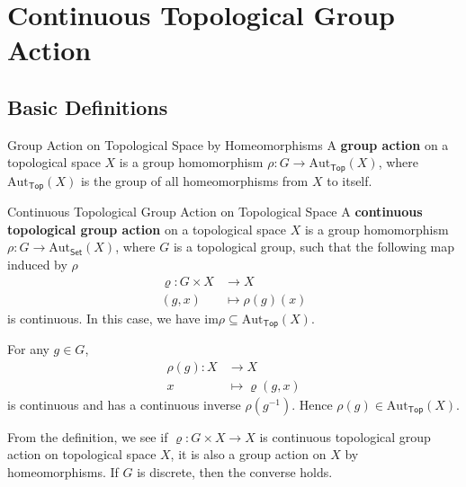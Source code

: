 \documentclass{report}
\begin{document}
\section{Continuous Topological Group Action}
\subsection{Basic Definitions}

\begin{definition}{Group Action on Topological Space by Homeomorphisms}{}
	A \textbf{group action} on a topological space $X$ is a group homomorphism $\rho:G\to \mathrm{Aut}_{\mathsf{Top}}(X)$, where $\mathrm{Aut}_{\mathsf{Top}}(X)$ is the group of all homeomorphisms from $X$ to itself.
\end{definition}


\begin{definition}{Continuous Topological Group Action on Topological Space}{}
	A \textbf{continuous topological group action} on a topological space $X$ is a group homomorphism $\rho:G\to \mathrm{Aut}_{\mathsf{Set}}(X)$, where $G$ is a topological group, such that the following map induced by $\rho$
	\begin{align*}
		\varrho:G\times X & \longrightarrow X      \\
		(g,x)             & \longmapsto \rho(g)(x)
	\end{align*}
	is continuous. In this case, we have $\mathrm{im}\rho \subseteq \mathrm{Aut}_{\mathsf{Top}}(X)$.
\end{definition}

\begin{prf}
	For any $g\in G$,
	\begin{align*}
		\rho(g): X & \longrightarrow X        \\
		x          & \longmapsto \varrho(g,x)
	\end{align*}
	is continuous and has a continuous inverse $\rho(g^{-1})$. Hence $\rho(g)\in \mathrm{Aut}_{\mathsf{Top}}(X)$.
\end{prf}

From the definition, we see if $\varrho:G\times X\to X$ is continuous topological group action on topological space $X$, it is also a group action on $X$ by homeomorphisms. If $G$ is discrete, then the converse holds.
\end{document}
